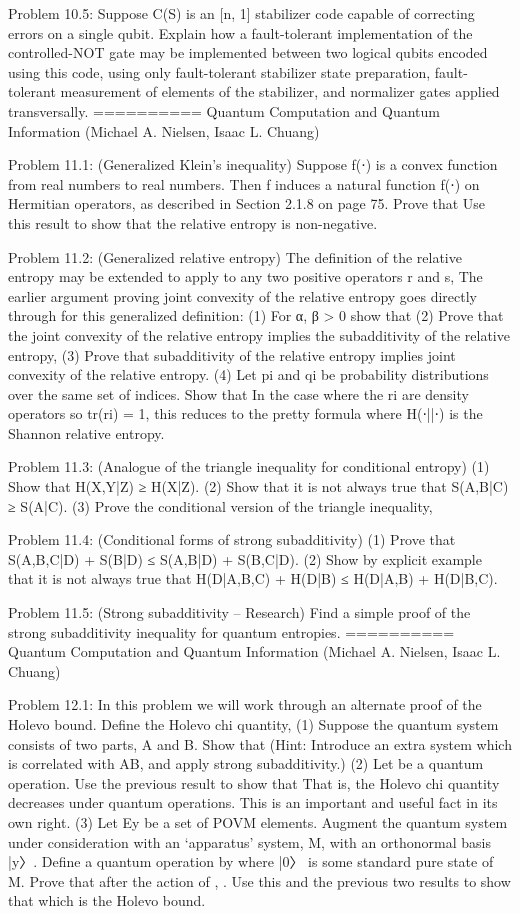 \documentclass{article}
\newcommand{\0}{{$|0\rangle$}}
\newcommand{\1}{{$|1\rangle$}}
\newcommand{\2}{\frac{1}{\sqrt{2}}}
\begin{document}
Problem 10.5: Suppose C(S) is an [n, 1] stabilizer code capable of correcting errors on a single qubit. Explain how a fault-tolerant implementation of the controlled-NOT gate may be implemented between two logical qubits encoded using this code, using only fault-tolerant stabilizer state preparation, fault-tolerant measurement of elements of the stabilizer, and normalizer gates applied transversally.
==========
Quantum Computation and Quantum Information (Michael A. Nielsen, Isaac L. Chuang)

Problem 11.1: (Generalized Klein’s inequality) Suppose f(⋅) is a convex function from real numbers to real numbers. Then f induces a natural function f(⋅) on Hermitian operators, as described in Section 2.1.8 on page 75. Prove that Use this result to show that the relative entropy is non-negative.

Problem 11.2: (Generalized relative entropy) The definition of the relative entropy may be extended to apply to any two positive operators r and s, The earlier argument proving joint convexity of the relative entropy goes directly through for this generalized definition: (1) For α, β > 0 show that (2) Prove that the joint convexity of the relative entropy implies the subadditivity of the relative entropy, (3) Prove that subadditivity of the relative entropy implies joint convexity of the relative entropy. (4) Let pi and qi be probability distributions over the same set of indices. Show that In the case where the ri are density operators so tr(ri) = 1, this reduces to the pretty formula where H(⋅||⋅) is the Shannon relative entropy.

Problem 11.3: (Analogue of the triangle inequality for conditional entropy) (1) Show that H(X,Y|Z) ≥ H(X|Z). (2) Show that it is not always true that S(A,B|C) ≥ S(A|C). (3) Prove the conditional version of the triangle inequality,

Problem 11.4: (Conditional forms of strong subadditivity) (1) Prove that S(A,B,C|D) + S(B|D) ≤ S(A,B|D) + S(B,C|D). (2) Show by explicit example that it is not always true that H(D|A,B,C) + H(D|B) ≤ H(D|A,B) + H(D|B,C).

Problem 11.5: (Strong subadditivity – Research) Find a simple proof of the strong subadditivity inequality for quantum entropies.
==========
Quantum Computation and Quantum Information (Michael A. Nielsen, Isaac L. Chuang)

Problem 12.1: In this problem we will work through an alternate proof of the Holevo bound. Define the Holevo chi quantity, (1) Suppose the quantum system consists of two parts, A and B. Show that (Hint: Introduce an extra system which is correlated with AB, and apply strong subadditivity.) (2) Let be a quantum operation. Use the previous result to show that That is, the Holevo chi quantity decreases under quantum operations. This is an important and useful fact in its own right. (3) Let Ey be a set of POVM elements. Augment the quantum system under consideration with an ‘apparatus’ system, M, with an orthonormal basis |y〉. Define a quantum operation by where |0〉 is some standard pure state of M. Prove that after the action of , . Use this and the previous two results to show that which is the Holevo bound.
\end{document}
